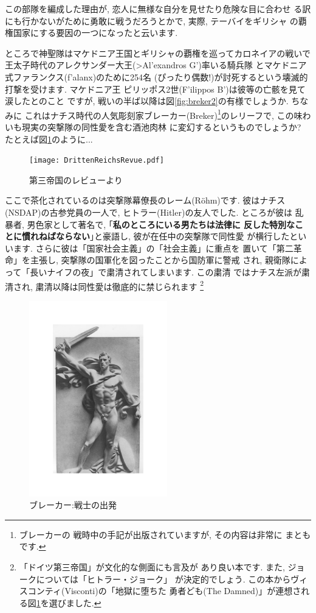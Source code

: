 \documentclass[b5j,8pt,twocolumn]{ltjsarticle}
\newcommand{\textgreek}[1]{\begingroup\fontencoding{LGR}\selectfont#1\endgroup}
\begin{document}
この部隊を編成した理由が, 恋人に無様な自分を見せたり危険な目に合わせ
る訳にも行かないがために勇敢に戦うだろうとかで, 実際, テーバイをギリシャ
の覇権国家にする要因の一つになったと云います.
\newline

ところで神聖隊はマケドニア王国とギリシャの覇権を巡ってカロネイアの戦いで
王太子時代のアレクサンダー大王(\textgreek{>Al'exandros G'})率いる騎兵隊
とマケドニア式ファランクス(\textgreek{f'alanx})のために254名
(ぴったり偶数!)が討死するという壊滅的打撃を受けます. マケドニア王
ピリッポス2世(\textgreek{F'ilippos B'})は彼等の亡骸を見て涙したとのこと
ですが, 戦いの半ば以降は図\ref{fig:breker2}の有様でしょうか. ちなみに
これはナチス時代の人気彫刻家ブレーカー(Breker)\footnote{ブレーカーの
戦時中の手記\cite{ブレーカー}が出版されていますが, その内容は非常に
まともです.}のレリーフで, この味わいも現実の突撃隊の同性愛を含む酒池肉林
に変幻するというものでしょうか? たとえば図\ref{fig:rrevue}のように...

\begin{figure}[htbp]
\begin{center}
\texttt{[image: DrittenReichsRevue.pdf]}
\caption{第三帝国のレビューより\cite{関}}
\label{fig:rrevue}
\end{center}
\end{figure}

ここで茶化されているのは突撃隊幕僚長のレーム(R\"ohm)です. 彼はナチス
(NSDAP)の古参党員の一人で, ヒトラー(Hitler)の友人でした. ところが彼は
乱暴者, 男色家として著名で, ｢\textbf{私のところにいる男たちは法律に
反した特別なことに慣れねばならない}｣と豪語し, 彼が在任中の突撃隊で同性愛
が横行したといいます. さらに彼は「国家社会主義」の「社会主義」に重点を
置いて「第二革命」を主張し, 突撃隊の国軍化を図ったことから国防軍に警戒
され, 親衛隊によって「長いナイフの夜」で粛清されてしまいます. この粛清
ではナチス左派が粛清され, 粛清以降は同性愛は徹底的に禁じられます
\footnote{「ドイツ第三帝国」\cite{クラーザー}が文化的な側面にも言及が
あり良い本です. また, ジョークについては「ヒトラー・ジョーク」\cite{関}
が決定的でしょう. この本からヴィスコンティ(Visconti)の「地獄に堕ちた
勇者ども(The Damned)」が連想される図\ref{fig:rrevue}を選びました.}
\newpage

\begin{figure}
\includegraphics[width=6cm]{Breker2_relief.pdf}
\caption{ブレーカー:戦士の出発}
\label{fig:breker1}
\end{figure}
\end{document}
